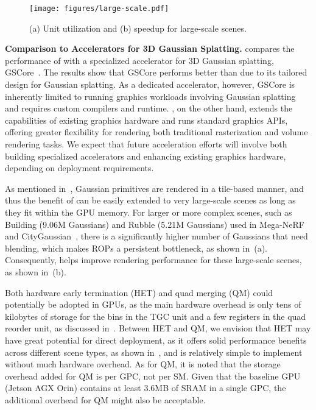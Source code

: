 \begin{figure}[t]
  \centering
  \texttt{[image: figures/large-scale.pdf]}
  \caption{(a) Unit utilization and (b) speedup for large-scale scenes.}
  \vspace{-0.20in}
  \label{fig:large-scale}
\end{figure}


\noindent\textbf{Comparison to Accelerators for 3D Gaussian Splatting.}
%
 compares the performance of \name{} with a
specialized accelerator for 3D Gaussian splatting, GSCore~\cite{lee:lee24}. 
%
The results show that GSCore performs better than \name{} due to its tailored
design for Gaussian splatting.
%
As a dedicated accelerator, however, GSCore is inherently limited to running
graphics workloads involving Gaussian splatting and requires custom compilers
and runtime. 
%
\name{}, on the other hand, extends the capabilities of existing graphics
hardware and runs standard graphics APIs, offering greater flexibility
for rendering both traditional rasterization and volume rendering tasks.
%
We expect that future acceleration efforts will involve both building
specialized accelerators and enhancing existing graphics hardware, depending on
deployment requirements.

%
As mentioned in~, Gaussian primitives are rendered in a tile-based
manner, and thus the benefit of \name{} can be easily extended to very
large-scale scenes as long as they fit within the GPU memory.
%
For larger or more complex scenes, such as Building (9.06M Gaussians) and
Rubble (5.21M Gaussians) used in Mega-NeRF~\cite{tur:ram22} and
CityGaussian~\cite{liu:gua24}, there is a significantly higher number of
Gaussians that need blending, which makes ROPs a persistent bottleneck, as
shown in~(a). Consequently, \name{} helps improve rendering
performance for these large-scale scenes, as shown in~(b).

%
Both hardware early termination (HET) and quad merging (QM) could potentially
be adopted in GPUs, as the main hardware overhead is only tens of kilobytes of
storage for the bins in the TGC unit and a few registers in the quad reorder
unit, as discussed in~.
%
Between HET and QM, we envision that HET may have great potential for direct
deployment, as it offers solid performance benefits across different scene
types, as shown in~, and is relatively simple to implement without
much hardware overhead.
%
As for QM, it is noted that the storage overhead added for QM is per GPC, not
per SM. Given that the baseline GPU (Jetson AGX Orin) contains at least 3.6MB
of SRAM in a single GPC, the additional overhead for QM might also be
acceptable.
